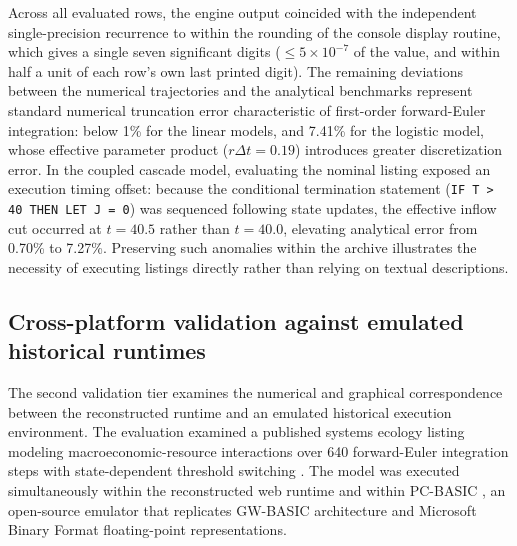 \documentclass[3p,times,authoryear,twocolumn]{elsarticle}
\begin{document}
%
%
Across all evaluated rows, the engine output coincided with the independent single-precision recurrence to within the rounding of the console display routine, which gives a single seven significant digits ($\le 5\times10^{-7}$ of the value, and within half a unit of each row's own last printed digit). The remaining deviations between the numerical trajectories and the analytical benchmarks represent standard numerical truncation error characteristic of first-order forward-Euler integration: below 1\% for the linear models, and 7.41\% for the logistic model, whose effective parameter product ($r\Delta t = 0.19$) introduces greater discretization error. In the coupled cascade model, evaluating the nominal listing exposed an execution timing offset: because the conditional termination statement (\texttt{IF T > 40 THEN LET J = 0}) was sequenced following state updates, the effective inflow cut occurred at $t = 40.5$ rather than $t = 40.0$, elevating analytical error from 0.70\% to 7.27\%. Preserving such anomalies within the archive illustrates the necessity of executing listings directly rather than relying on textual descriptions.

\subsection{Cross-platform validation against emulated historical runtimes}

The second validation tier examines the numerical and graphical correspondence between the reconstructed runtime and an emulated historical execution environment. The evaluation examined a published systems ecology listing modeling macroeconomic-resource interactions over 640 forward-Euler integration steps with state-dependent threshold switching \citep[Table~3]{odum1989}. The model was executed simultaneously within the reconstructed web runtime and within PC-BASIC \citep{pcbasic}, an open-source emulator that replicates GW-BASIC architecture and Microsoft Binary Format floating-point representations.
\end{document}
